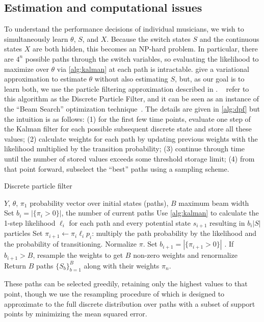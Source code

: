 \documentclass[12pt]{article}
\begin{document}
\subsection{Estimation and computational issues}
\label{sec:computational-issues}

To understand the performance decisions of individual musicians, we
wish to simultaneously learn $\theta$, $S$, and $X$. Because the
switch states $S$ and the continuous states $X$ are both hidden, this becomes
an NP-hard problem. In particular, there are $4^n$ possible paths
through the switch variables, so evaluating the likelihood to maximize
over $\theta$ via \autoref{alg:kalman} at each path is intractable. 
\citet{GhahramaniHinton2000} give a variational approximation to
estimate $\theta$ without also estimating $S$, but, as our goal is to
learn both, we use the particle filtering approximation described in
\citep{FearnheadClifford2003}. ~\cite{WhiteleyAndrieu2010} refer to
this algorithm as the Discrete Particle Filter, and it can be seen as
an instance of the ``Beam Search'' optimization
technique~\citep{Bisiani1992}. The details are given in
\autoref{alg:dpf} but the intuition is as follows: (1) for the first
few time points, evaluate
one step of the Kalman filter for each possible subsequent discrete
state and store all these values; (2) calculate weights for each path
by updating previous weights with the likelihood multiplied by the transition probability;
(3) continue through time until the number of stored values exceeds
some threshold storage limit; (4) from that point forward, subselect
the ``best'' paths using a sampling scheme.
\begin{algorithm}[t!]
  \caption{Discrete particle filter\label{alg:dpf}}
  \begin{algorithmic}[1]
  $Y$, $\theta$, $\pi_1$ probability vector over initial states
  (paths), $B$ maximum beam width
  \STATE Set $b_i=|\{\pi_i>0\}|$, the number of current paths
  \STATE Use \autoref{alg:kalman} to calculate the 1-step likelihood
  $\ell_i$ for each path and every potential state $s_{i+1}$ resulting in $b_i|S|$ particles
  \STATE Set $\pi_{i+1} \leftarrow \pi_i\ell_i p_i$: multiply the path
  probability by the likelihood and the probability of
  transitioning. Normalize $\pi$.
  \STATE Set $b_{i+1}=|\{\pi_{i+1}>0\}|$ . If $b_{i+1} > B$, resample the
  weights to get $B$ non-zero weights and renormalize
  \ENDFOR
  \STATE Return $B$ paths $\{S_b\}_{b=1}^B$ along with their weights $\pi_{n}$.
\end{algorithmic}
\end{algorithm}
These paths can be
selected greedily, retaining only the highest values to that point,
though we use the resampling procedure of
\citep{FearnheadClifford2003} which is designed to 
approximate to the full discrete distribution over paths with a subset
of support points by minimizing the mean squared
error.
\end{document}

